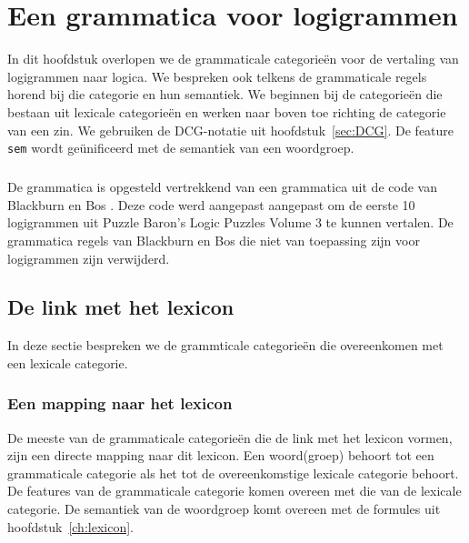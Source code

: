 \chapter{Een grammatica voor logigrammen}
\label{ch:grammatica}

In dit hoofdstuk overlopen we de grammaticale categorieën voor de vertaling van logigrammen naar logica. We bespreken ook telkens de grammaticale regels horend bij die categorie en hun semantiek. We beginnen bij de categorieën die bestaan uit lexicale categorieën en werken naar boven toe richting de categorie van een zin. We gebruiken de DCG-notatie uit hoofdstuk~\ref{sec:DCG}. De feature \texttt{sem} wordt geünificeerd met de semantiek van een woordgroep.

\paragraph{}De grammatica is opgesteld vertrekkend van een grammatica uit de code van Blackburn en Bos \cite{Blackburn2006}. Deze code werd aangepast aangepast om de eerste 10 logigrammen uit Puzzle Baron's Logic Puzzles Volume 3 \cite{logigrammen} te kunnen vertalen. De grammatica regels van Blackburn en Bos die niet van toepassing zijn voor logigrammen zijn verwijderd.

\section{De link met het lexicon}
In deze sectie bespreken we de grammticale categorieën die overeenkomen met een lexicale categorie.

\subsection{Een mapping naar het lexicon}
\label{sec:lexgram}

De meeste van de grammaticale categorieën die de link met het lexicon vormen, zijn een directe mapping naar dit lexicon. Een woord(groep) behoort tot een grammaticale categorie als het tot de overeenkomstige lexicale categorie behoort. De features van de grammaticale categorie komen overeen met die van de lexicale categorie. De semantiek van de woordgroep komt overeen met de formules uit hoofdstuk~\ref{ch:lexicon}.

